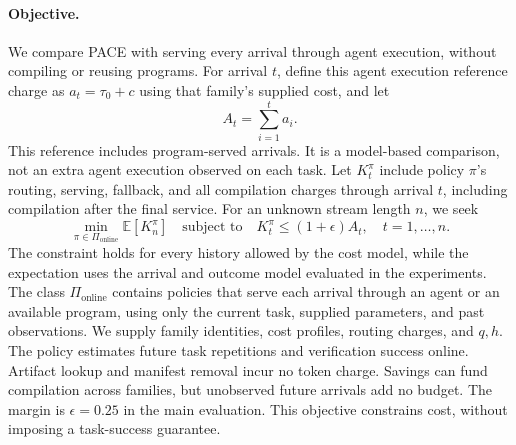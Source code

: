 \paragraph{Objective.}
We compare PACE with serving every arrival through agent execution, without compiling or reusing programs.
For arrival $t$, define this agent execution reference charge as $a_t=\tau_0+c$ using that family's supplied cost, and let
\begin{equation}
A_t=\sum_{i=1}^{t}a_i.
\label{eq:agent-reference}
\end{equation}
This reference includes program-served arrivals.
It is a model-based comparison, not an extra agent execution observed on each task.
Let $K_t^\pi$ include policy $\pi$'s routing, serving, fallback, and all compilation charges through arrival $t$, including compilation after the final service.
For an unknown stream length $n$, we seek
\begin{equation}
\min_{\pi\in\Pi_{\mathrm{online}}}\mathbb{E}[K_n^\pi]
\quad\text{subject to}\quad
K_t^\pi\leq(1+\epsilon)A_t,\quad t=1,\ldots,n.
\label{eq:objective}
\end{equation}
The constraint holds for every history allowed by the cost model, while the expectation uses the arrival and outcome model evaluated in the experiments.
The class $\Pi_{\mathrm{online}}$ contains policies that serve each arrival through an agent or an available program, using only the current task, supplied parameters, and past observations.
We supply family identities, cost profiles, routing charges, and $q,h$.
The policy estimates future task repetitions and verification success online.
Artifact lookup and manifest removal incur no token charge.
Savings can fund compilation across families, but unobserved future arrivals add no budget.
The margin is $\epsilon=0.25$ in the main evaluation.
This objective constrains cost, without imposing a task-success guarantee.
